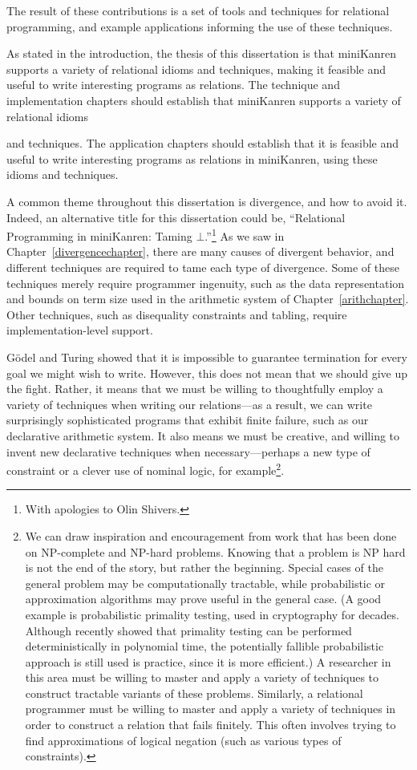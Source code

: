 \noindent The result of these contributions is a set of tools and
techniques for relational programming, and example applications
informing the use of these techniques.

As stated in the introduction, the thesis of this dissertation is that
miniKanren supports a variety of relational idioms and techniques,
making it feasible and useful to write interesting programs as
relations.  The technique and implementation chapters should establish
that miniKanren supports a variety of relational idioms

\noindent 
and techniques.  The application chapters should establish that it is
feasible and useful to write interesting programs as relations in
miniKanren, using these idioms and techniques.

A common theme throughout this dissertation is divergence, and how to
avoid it.  Indeed, an alternative title for this dissertation could
be, ``Relational Programming in miniKanren: Taming
$\bot$.''\footnote{With apologies to Olin Shivers.}  As we saw in
Chapter~\ref{divergencechapter}, there are many causes of divergent
behavior, and different techniques are required to tame each type of
divergence.  Some of these techniques merely require programmer
ingenuity, such as the data representation and bounds on term size
used in the arithmetic system of Chapter~\ref{arithchapter}.  Other
techniques, such as disequality constraints and tabling, require
implementation-level support.

G\"{o}del and Turing showed that it is impossible to guarantee
termination for every goal we might wish to write.  However, this does
not mean that we should give up the fight.  Rather, it means that we
must be willing to thoughtfully employ a variety of techniques when
writing our relations---as a result, we can write surprisingly
sophisticated programs that exhibit finite failure, such as our
declarative arithmetic system.  It also means we must be creative, and
willing to invent new declarative techniques when necessary---perhaps
a new type of constraint or a clever use of nominal logic, for
example\footnote{We can draw inspiration and encouragement from work
  that has been done on NP-complete and NP-hard problems.  Knowing
  that a problem is NP hard is not the end of the story, but rather
  the beginning.  Special cases of the general problem may be
  computationally tractable, while probabilistic or approximation
  algorithms may prove useful in the general case.  (A good example is
  probabilistic primality testing, used in cryptography for decades.
  Although \citet{Agrawal02primesis} recently showed that primality
  testing can be performed deterministically in polynomial time, the
  potentially fallible probabilistic approach is still used is
  practice, since it is more efficient.)  A researcher in this area
  must be willing to master and apply a variety of techniques to
  construct tractable variants of these problems. Similarly, a
  relational programmer must be willing to master and apply a variety
  of techniques in order to construct a relation that fails finitely.
  This often involves trying to find approximations of logical
  negation (such as various types of constraints).}.

